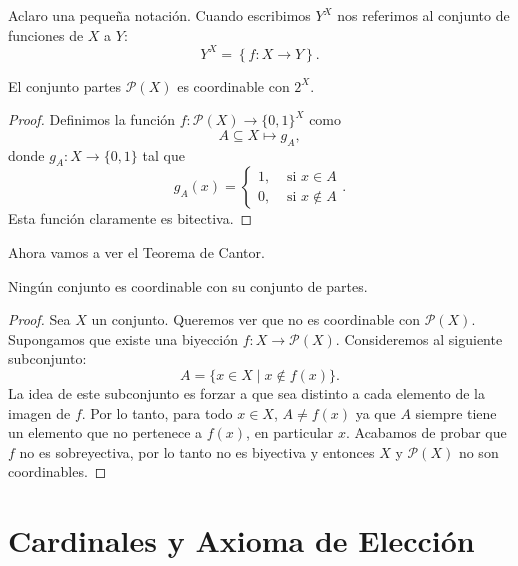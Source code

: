 Aclaro una pequeña notación. Cuando escribimos $Y^X$ nos referimos al conjunto de funciones de $X$ a $Y$:
\begin{equation*}
	Y^{X} = \left\{ f : X \to Y \right\}.
\end{equation*}

\begin{proposition}
	El conjunto partes $\mathcal{P}(X)$ es coordinable con $2^X$.
\end{proposition}

\begin{proof}
	Definimos la función $f : \mathcal{P}(X) \to \{0, 1\}^X$ como
	\begin{equation*}
		A \subseteq X \mapsto g_A,
	\end{equation*}
	donde $g_A : X \to \{ 0, 1 \}$ tal que
	\begin{equation*}
		g_A(x) = \begin{cases}
			1, & \text{ si }x \in A      \\
			0, & \text{ si } x \not\in A
		\end{cases}.
	\end{equation*}
	Esta función claramente es bitectiva.
\end{proof}

Ahora vamos a ver el Teorema de Cantor.

\begin{theorem}
	Ningún conjunto es coordinable con su conjunto de partes.
\end{theorem}

\begin{proof}
	Sea $X$ un conjunto. Queremos ver que no es coordinable con $\mathcal{P}(X)$. Supongamos que existe una biyección $f : X \to \mathcal{P}(X)$. Consideremos al siguiente subconjunto:
	\begin{equation*}
		A = \{ x \in X \mid x \not \in f(x) \}.
	\end{equation*}
	La idea de este subconjunto es forzar a que sea distinto a cada elemento de la imagen de $f$. Por lo tanto, para todo $x \in X$, $A \neq f(x)$ ya que $A$ siempre tiene un elemento que no pertenece a $f(x)$, en particular $x$. Acabamos de probar que $f$ no es sobreyectiva, por lo tanto no es biyectiva y entonces $X$ y $\mathcal{P}(X)$ no son coordinables.
\end{proof}


\section{Cardinales y Axioma de Elección}

